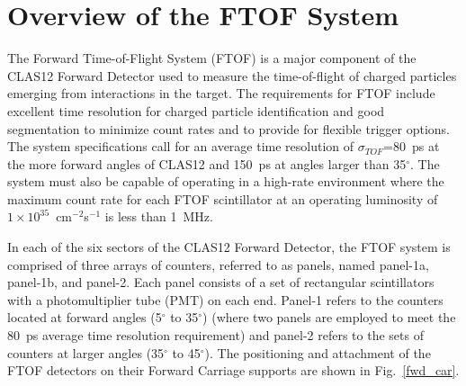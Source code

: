 \documentclass{elsart}
\begin{document}

\section{Overview of the FTOF System}
\label{sec:overview}

The Forward Time-of-Flight System (FTOF) is a major component of the CLAS12 Forward Detector
used to measure the time-of-flight of charged particles emerging from interactions in the target.
The requirements for FTOF include excellent time resolution for charged particle identification and
good segmentation to minimize count rates and to provide for flexible trigger options. The system
specifications call for an average time resolution of $\sigma_{TOF}$=80~ps at the more forward angles
of CLAS12 and 150~ps at angles larger than 35$^\circ$. The system must also be capable of operating
in a high-rate environment where the maximum count rate for each FTOF scintillator at an operating
luminosity of $1 \times 10^{35}$~cm$^{-2}$s$^{-1}$ is less than 1~MHz.

In each of the six sectors of the CLAS12 Forward Detector, the FTOF system is comprised of three
arrays of counters, referred to as panels, named panel-1a, panel-1b, and panel-2. Each panel consists of a
set of rectangular scintillators with a photomultiplier tube (PMT) on each end. Panel-1 refers to the
counters located at forward angles (5$^\circ$ to 35$^\circ$) (where two panels are employed to meet the
80~ps average time resolution requirement) and panel-2 refers to the sets of counters at larger angles
(35$^\circ$ to 45$^\circ$). The positioning and attachment of the FTOF detectors on their Forward
Carriage supports are shown in Fig.~\ref{fwd_car}.
\end{document}
